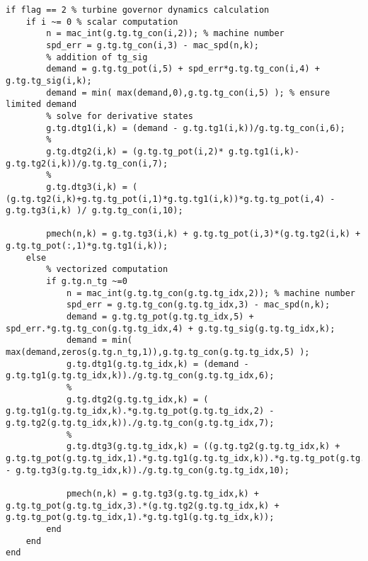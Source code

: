 \documentclass[12pt]{article}
\begin{document}
\begin{verbatim}
if flag == 2 % turbine governor dynamics calculation
    if i ~= 0 % scalar computation
        n = mac_int(g.tg.tg_con(i,2)); % machine number
        spd_err = g.tg.tg_con(i,3) - mac_spd(n,k);
        % addition of tg_sig
        demand = g.tg.tg_pot(i,5) + spd_err*g.tg.tg_con(i,4) + g.tg.tg_sig(i,k);
        demand = min( max(demand,0),g.tg.tg_con(i,5) ); % ensure limited demand
        % solve for derivative states
        g.tg.dtg1(i,k) = (demand - g.tg.tg1(i,k))/g.tg.tg_con(i,6);
        %
        g.tg.dtg2(i,k) = (g.tg.tg_pot(i,2)* g.tg.tg1(i,k)-g.tg.tg2(i,k))/g.tg.tg_con(i,7);
        %
        g.tg.dtg3(i,k) = ( (g.tg.tg2(i,k)+g.tg.tg_pot(i,1)*g.tg.tg1(i,k))*g.tg.tg_pot(i,4) - g.tg.tg3(i,k) )/ g.tg.tg_con(i,10);
        
        pmech(n,k) = g.tg.tg3(i,k) + g.tg.tg_pot(i,3)*(g.tg.tg2(i,k) + g.tg.tg_pot(:,1)*g.tg.tg1(i,k));
    else
        % vectorized computation
        if g.tg.n_tg ~=0
            n = mac_int(g.tg.tg_con(g.tg.tg_idx,2)); % machine number
            spd_err = g.tg.tg_con(g.tg.tg_idx,3) - mac_spd(n,k);
            demand = g.tg.tg_pot(g.tg.tg_idx,5) + spd_err.*g.tg.tg_con(g.tg.tg_idx,4) + g.tg.tg_sig(g.tg.tg_idx,k);
            demand = min( max(demand,zeros(g.tg.n_tg,1)),g.tg.tg_con(g.tg.tg_idx,5) );
            g.tg.dtg1(g.tg.tg_idx,k) = (demand - g.tg.tg1(g.tg.tg_idx,k))./g.tg.tg_con(g.tg.tg_idx,6);
            %
            g.tg.dtg2(g.tg.tg_idx,k) = ( g.tg.tg1(g.tg.tg_idx,k).*g.tg.tg_pot(g.tg.tg_idx,2) - g.tg.tg2(g.tg.tg_idx,k))./g.tg.tg_con(g.tg.tg_idx,7);
            %
            g.tg.dtg3(g.tg.tg_idx,k) = ((g.tg.tg2(g.tg.tg_idx,k) + g.tg.tg_pot(g.tg.tg_idx,1).*g.tg.tg1(g.tg.tg_idx,k)).*g.tg.tg_pot(g.tg.tg_idx,4) - g.tg.tg3(g.tg.tg_idx,k))./g.tg.tg_con(g.tg.tg_idx,10);
            
            pmech(n,k) = g.tg.tg3(g.tg.tg_idx,k) + g.tg.tg_pot(g.tg.tg_idx,3).*(g.tg.tg2(g.tg.tg_idx,k) + g.tg.tg_pot(g.tg.tg_idx,1).*g.tg.tg1(g.tg.tg_idx,k));
        end
    end
end


\end{verbatim}
\end{document}
